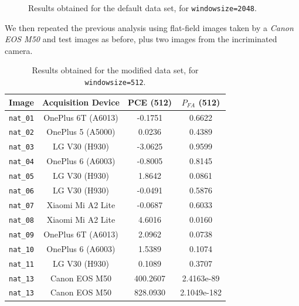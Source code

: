 \documentclass[a4paper, 12pt]{article}
\begin{document}
\begin{figure}[H]
	\centering
	\caption{Results obtained for the default data set, for \texttt{windowsize=2048}.}
	\label{fig:defaultdataset2048}
\end{figure}

We then repeated the previous analysis using flat-field images taken by a \textit{Canon EOS M50} and test images as before, plus two images from the incriminated camera.

\begin{table}[H]
	\centering	
	\begin{tabular}{c|c|c|c}
		Image			 & Acquisition Device	& PCE (512)	& $P_{FA}$ (512) \\
		\toprule
		\texttt{nat\_01} & OnePlus 6T (A6013)	& -0.1751	& 0.6622 \\
		\texttt{nat\_02} & OnePlus 5 (A5000) 	& 0.0236	& 0.4389 \\
		\texttt{nat\_03} & LG V30 (H930) 		& -3.0625	& 0.9599 \\
		\texttt{nat\_04} & OnePlus 6 (A6003) 	& -0.8005	& 0.8145 \\
		\texttt{nat\_05} & LG V30 (H930) 		& 1.8642	& 0.0861 \\
		\texttt{nat\_06} & LG V30 (H930) 		& -0.0491	& 0.5876 \\
		\texttt{nat\_07} & Xiaomi Mi A2 Lite	& -0.0687	& 0.6033 \\
		\texttt{nat\_08} & Xiaomi Mi A2 Lite 	& 4.6016	& 0.0160 \\
		\texttt{nat\_09} & OnePlus 6T (A6013)	& 2.0962 	& 0.0738 \\
		\texttt{nat\_10} & OnePlus 6 (A6003) 	& 1.5389	& 0.1074 \\
		\texttt{nat\_11} & LG V30 (H930) 		& 0.1089	& 0.3707 \\
		\texttt{nat\_13} & Canon EOS M50		& 400.2607	& 2.4163e-89 \\
		\texttt{nat\_13} & Canon EOS M50		& 828.0930	& 2.1049e-182
	\end{tabular}
	\caption{Results obtained for the modified data set, for \texttt{windowsize=512}.}
	\label{tab:modifieddataset}
\end{table}
\end{document}
